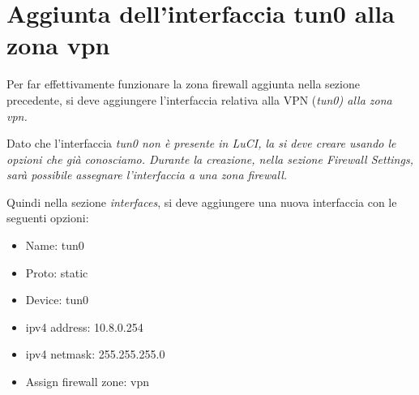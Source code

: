 \section{Aggiunta dell'interfaccia tun0 alla zona vpn}

Per far effettivamente funzionare la zona firewall aggiunta nella sezione precedente, si deve aggiungere l'interfaccia relativa alla VPN (\it{tun0}) alla zona \it{vpn}.

Dato che l'interfaccia \it{tun0} non è presente in LuCI, la si deve creare usando le opzioni che già conosciamo. Durante la creazione, nella sezione \it{Firewall Settings}, sarà possibile assegnare l'interfaccia a una zona firewall.

Quindi nella sezione \textit{interfaces}, si deve aggiungere una nuova interfaccia con le seguenti opzioni:

\begin{itemize}
    \item Name: tun0
    \item Proto: static
    \item Device: tun0
    \item ipv4 address: 10.8.0.254
    \item ipv4 netmask: 255.255.255.0
    \item Assign firewall zone: vpn
\end{itemize}

